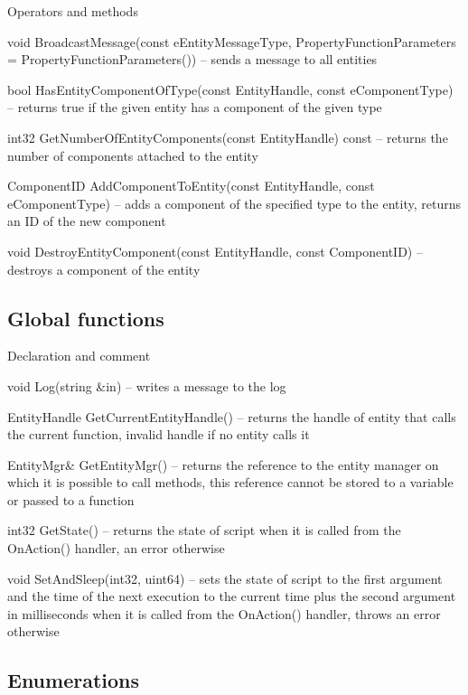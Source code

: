 \documentclass[12pt, a4paper]{article}
\newenvironment{titled-itemize}[1]
{
\vspace{5mm}
\noindent\textbf{#1}
\begin{itemize}
}
{
\end{itemize}
}
\begin{document}
\begin{titled-itemize}{Operators and methods}
  \item void BroadcastMessage(const eEntityMessageType, PropertyFunctionParameters = PropertyFunctionParameters()) -- sends a message to all entities
  \item bool HasEntityComponentOfType(const EntityHandle, const eComponentType) -- returns true if the given entity has a component of the given type
  \item int32 GetNumberOfEntityComponents(const EntityHandle) const -- returns the number of components attached to the entity
  \item ComponentID AddComponentToEntity(const EntityHandle, const e\-Com\-po\-nent\-Ty\-pe) -- adds a component of the specified type to the entity, returns an ID of the new component
  \item void DestroyEntityComponent(const EntityHandle, const Com\-po\-nent\-ID) -- destroys a component of the entity
\end{titled-itemize}

\subsection{Global functions}

\begin{titled-itemize}{Declaration and comment}
  \item void Log(string \&in) -- writes a message to the log
  \item EntityHandle GetCurrentEntityHandle() -- returns the handle of entity that calls the current function, invalid handle if no entity calls it
  \item EntityMgr\& GetEntityMgr() -- returns the reference to the entity manager on which it is possible to call methods, this reference cannot be stored to a variable or passed to a function
  \item int32 GetState() -- returns the state of script when it is called from the OnAction() handler, an error otherwise
  \item void SetAndSleep(int32, uint64) -- sets the state of script to the first argument and the time of the next execution to the current time plus the second argument in milliseconds when it is called from the OnAction() handler, throws an error otherwise
\end{titled-itemize}

\subsection{Enumerations}
\end{document}
